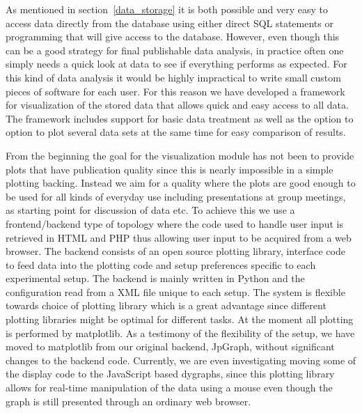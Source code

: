 As mentioned in section~\ref{data_storage} it is both possible and very easy to
access data directly from the database using either direct SQL statements or
programming that will give access to the database. However, even though this
can be a good strategy for final publishable data analysis, in practice often
one simply needs a quick look at data to see if everything performs as expected.
For this kind of data analysis it would be highly impractical to write small
custom pieces of software for each user. For this reason we have developed a
framework for visualization of the stored data that allows quick and easy
access to all data. The framework includes support for basic data treatment as
well as the option to option to plot several data sets at the same time for
easy comparison of results.

From the beginning the goal for the visualization module has not been to
provide plots that have publication quality since this is nearly impossible in
a simple plotting backing. Instead we aim for a quality where the plots are
good enough to be used for all kinds of everyday use including presentations at
group meetings, as starting point for discussion of data etc. To achieve this
we use a frontend/backend type of topology where the code used to handle user
input is retrieved in HTML and PHP thus allowing user input to be acquired from
a web browser. The backend consists of an open source plotting library,
interface code to feed data into the plotting code and setup preferences
specific to each experimental setup. The backend is mainly written in
Python\cite{python} and the configuration read from a XML file unique to each
setup. The system is flexible towards choice of plotting library which is a
great advantage since different plotting libraries might be optimal for
different tasks. At the moment all plotting is performed by
matplotlib\cite{matplotlib}. As a testimony of the flexibility of the setup, we
have moved to matplotlib from our original backend, JpGraph\cite{jpgraph},
without significant changes to the backend code. Currently, we are even
investigating moving some of the display code to the JavaScript based
dygraphs\cite{dygraphs}, since this plotting library allows for real-time
manipulation of the data using a mouse even though the graph is still
presented through an ordinary web browser.
